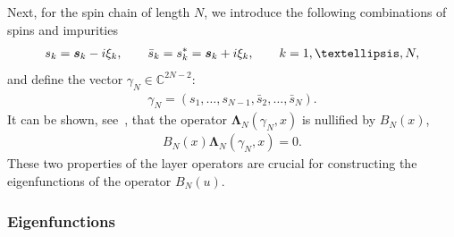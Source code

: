 \documentclass[11pt]{article}
\numberwithin{equation}{section}
\numberwithin{equation}{section}
\begin{document}
Next, for the spin chain of length $N$, we introduce the following combinations of spins and impurities
\begin{gather*}
s_k=\boldsymbol s_k - {\rm i}\xi_k, \qquad
\bar s_k=s_k^*=\boldsymbol s_k + {\rm i}\xi_k, \qquad
k=1,\dots,N,
\end{gather*}
and define the vector $\gamma_N\in\mathbb C^{2N-2}$:
 \begin{gather}\label{definition:gammaN}
\gamma_N=(s_1,\dots, s_{N-1},\bar s_2,\dots, \bar s_N).
\end{gather}
It can be shown, see~\cite{Derkachov:2002tf}, that the operator $\boldsymbol\Lambda_{N}(\gamma_N,x)$ is nullified by $B_N(x)$,
\begin{gather}\label{BLambda=0}
B_N(x)\boldsymbol\Lambda_{N}(\gamma_N,x)=0.
\end{gather}
These two properties of the layer operators are crucial for constructing the eigenfunctions of the operator $B_N(u)$.


\subsubsection{Eigenfunctions}\label{sect:B-eigenfunctions}
\end{document}
